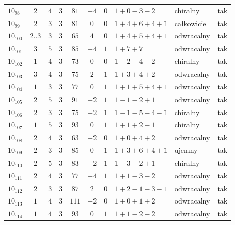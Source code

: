 \begin{longtable}{lccccccllc}
$10_{98}$   &  $2$     &  $4$  &  $3$      &  $81$   &  $-4$  &  $0$  &  $1+0-3-2$      &  chiralny    &  tak  \\
$10_{99}$   &  $2$     &  $3$  &  $3$      &  $81$   &  $0$   &  $0$  &  $1+4+6+4+1$    &  całkowicie  &  tak  \\
$10_{100}$  &  $2..3$  &  $3$  &  $3$      &  $65$   &  $4$   &  $0$  &  $1+4+5+4+1$    &  odwracalny  &  tak  \\
$10_{101}$  &  $3$     &  $5$  &  $3$      &  $85$   &  $-4$  &  $1$  &  $1+7+7$        &  odwracalny  &  tak  \\
$10_{102}$  &  $1$     &  $4$  &  $3$      &  $73$   &  $0$   &  $0$  &  $1-2-4-2$      &  chiralny    &  tak  \\
$10_{103}$  &  $3$     &  $4$  &  $3$      &  $75$   &  $2$   &  $1$  &  $1+3+4+2$      &  odwracalny  &  tak  \\
$10_{104}$  &  $1$     &  $3$  &  $3$      &  $77$   &  $0$   &  $1$  &  $1+1+5+4+1$    &  odwracalny  &  tak  \\
$10_{105}$  &  $2$     &  $5$  &  $3$      &  $91$   &  $-2$  &  $1$  &  $1-1-2+1$      &  odwracalny  &  tak  \\
$10_{106}$  &  $2$     &  $3$  &  $3$      &  $75$   &  $-2$  &  $1$  &  $1-1-5-4-1$    &  chiralny    &  tak  \\
$10_{107}$  &  $1$     &  $5$  &  $3$      &  $93$   &  $0$   &  $1$  &  $1+1+2-1$      &  chiralny    &  tak  \\
$10_{108}$  &  $2$     &  $4$  &  $3$      &  $63$   &  $-2$  &  $0$  &  $1+0+4+2$      &  odwracalny  &  tak  \\
$10_{109}$  &  $2$     &  $3$  &  $3$      &  $85$   &  $0$   &  $1$  &  $1+3+6+4+1$    &  ujemny      &  tak  \\
$10_{110}$  &  $2$     &  $5$  &  $3$      &  $83$   &  $-2$  &  $1$  &  $1-3-2+1$      &  chiralny    &  tak  \\
$10_{111}$  &  $2$     &  $4$  &  $3$      &  $77$   &  $-4$  &  $1$  &  $1+1-3-2$      &  odwracalny  &  tak  \\
$10_{112}$  &  $2$     &  $3$  &  $3$      &  $87$   &  $2$   &  $0$  &  $1+2-1-3-1$    &  odwracalny  &  tak  \\
$10_{113}$  &  $1$     &  $4$  &  $3$      &  $111$  &  $-2$  &  $0$  &  $1+0+1+2$      &  odwracalny  &  tak  \\
$10_{114}$  &  $1$     &  $4$  &  $3$      &  $93$   &  $0$   &  $1$  &  $1+1-2-2$      &  odwracalny  &  tak  \\

\end{longtable}

